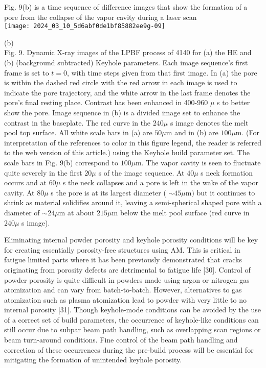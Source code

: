 \documentclass[10pt]{article}
\begin{document}
Fig. 9(b) is a time sequence of difference images that show the formation of a pore from the collapse of the vapor cavity during a laser scan\\
\texttt{[image: 2024\_03\_10\_5d6abf0de1bf85882ee9g-09]}

(b)\\
Fig. 9. Dynamic X-ray images of the LPBF process of 4140 for (a) the HE and (b) (background subtracted) Keyhole parameters. Each image sequence's first frame is set to $t=0$, with time steps given from that first image. In (a) the pore is within the dashed red circle with the red arrow in each image is used to indicate the pore trajectory, and the white arrow in the last frame denotes the pore's final resting place. Contrast has been enhanced in 400-960 $\mu$ s to better show the pore. Image sequence in (b) is a divided image set to enhance the contrast in the baseplate. The red curve in the $240 \mu$ s image denotes the melt pool top surface. All white scale bars in (a) are $50 \mu \mathrm{m}$ and in (b) are $100 \mu \mathrm{m}$. (For interpretation of the references to color in this figure legend, the reader is referred to the web version of this article.) using the Keyhole build parameter set. The scale bars in Fig. 9(b) correspond to $100 \mu \mathrm{m}$. The vapor cavity is seen to fluctuate quite severely in the first $20 \mu$ s of the image sequence. At $40 \mu$ s neck formation occurs and at $60 \mu$ s the neck collapses and a pore is left in the wake of the vapor cavity. At $80 \mu$ s the pore is at its largest diameter ( $\sim 45 \mu \mathrm{m})$ but it continues to shrink as material solidifies around it, leaving a semi-spherical shaped pore with a diameter of $\sim 24 \mu \mathrm{m}$ at about $215 \mu \mathrm{m}$ below the melt pool surface (red curve in $240 \mu$ s image).

Eliminating internal powder porosity and keyhole porosity conditions will be key for creating essentially porosity-free structures using AM. This is critical in fatigue limited parts where it has been previously demonstrated that cracks originating from porosity defects are detrimental to fatigue life [30]. Control of powder porosity is quite difficult in powders made using argon or nitrogen gas atomization and can vary from batch-to-batch. However, alternatives to gas atomization such as plasma atomization lead to powder with very little to no internal porosity [31]. Though keyhole-mode conditions can be avoided by the use of a correct set of build parameters, the occurrence of keyhole-like conditions can still occur due to subpar beam path handling, such as overlapping scan regions or beam turn-around conditions. Fine control of the beam path handling and correction of these occurrences during the pre-build process will be essential for mitigating the formation of unintended keyhole porosity.
\end{document}
